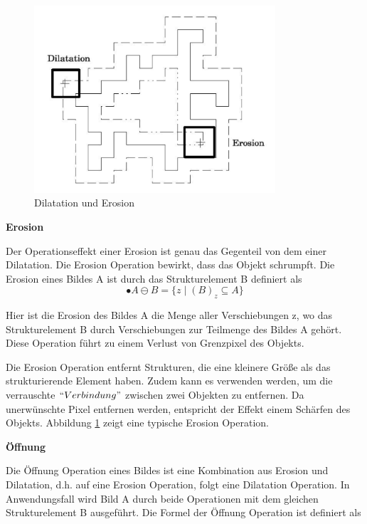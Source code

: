 \begin{figure}[H]
 \centering 
  \includegraphics[keepaspectratio,width=0.8\textwidth]{images/4_ZweiteErfahrung/Morphological/DilatationundErosion.pdf}
 \caption{Dilatation und Erosion}
 \label{fig:Dilatation und Erosion}
\end{figure} 


\textbf{Erosion}

Der Operationseffekt einer Erosion ist genau das Gegenteil von dem einer Dilatation. Die Erosion Operation bewirkt, dass das Objekt schrumpft. Die Erosion eines Bildes A ist durch das Strukturelement B definiert als 
\begin{equation}
•A \ominus B =\lbrace z \mid (B)_z \subseteq A \rbrace  
\end{equation}

Hier ist die Erosion des Bildes A die Menge aller Verschiebungen z, wo das Strukturelement B durch Verschiebungen zur Teilmenge des Bildes A gehört. Diese Operation führt zu einem Verlust von Grenzpixel des Objekts.

Die Erosion Operation entfernt Strukturen, die eine kleinere Größe als das strukturierende Element haben. Zudem kann es verwenden werden, um die verrauschte $ ``Verbindung" $ zwischen zwei Objekten zu entfernen. Da unerwünschte Pixel entfernen werden, entspricht der Effekt einem Schärfen des Objekts. Abbildung \ref{fig:Dilatation und Erosion} zeigt eine typische Erosion Operation.


\textbf{Öffnung}

Die Öffnung Operation eines Bildes ist eine Kombination aus Erosion und Dilatation, d.h. auf eine Erosion Operation, folgt eine Dilatation Operation. In Anwendungsfall wird Bild A durch beide Operationen mit dem gleichen Strukturelement B ausgeführt. Die Formel der Öffnung Operation ist definiert als

